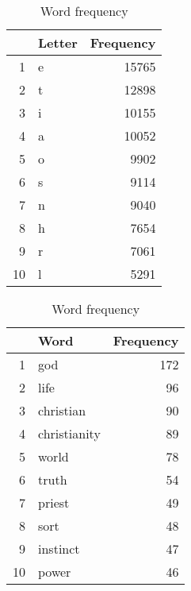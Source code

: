 \documentclass[letterpaper, 10 pt, conference]{article}
\begin{document}
\begin{table}[ht]
\caption{Word and character frequency}
\begin{subtable}[ht]{0.45\textwidth}
\centering
\caption{Character frequency}
\begin{tabular}{rlr}
  \hline
 & Letter & Frequency \\ 
  \hline
1 & e & 15765 \\ 
  2 & t & 12898 \\ 
  3 & i & 10155 \\ 
  4 & a & 10052 \\ 
  5 & o & 9902 \\ 
  6 & s & 9114 \\ 
  7 & n & 9040 \\ 
  8 & h & 7654 \\ 
  9 & r & 7061 \\ 
  10 & l & 5291 \\ 
   \hline
\end{tabular}
\end{subtable}
\hfill
\begin{subtable}[ht]{0.45\textwidth}
\centering
\caption{Word frequency}
\begin{tabular}{rlr}
  \hline
 & Word & Frequency \\ 
  \hline
1 & god & 172 \\ 
  2 & life &  96 \\ 
  3 & christian &  90 \\ 
  4 & christianity &  89 \\ 
  5 & world &  78 \\ 
  6 & truth &  54 \\ 
  7 & priest &  49 \\ 
  8 & sort &  48 \\ 
  9 & instinct &  47 \\ 
  10 & power &  46 \\ 
   \hline
\end{tabular}
\end{subtable}
\label{tab:words-chars}
\end{table}
\end{document}
